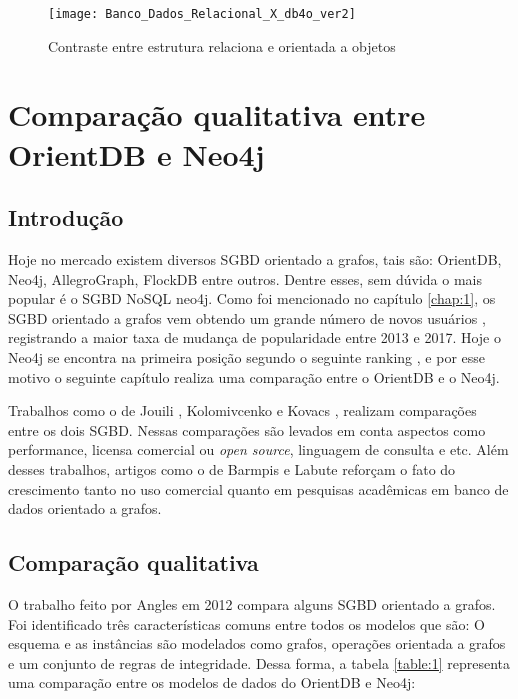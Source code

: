 \begin{figure}[h]
	\centering
    \texttt{[image: Banco\_Dados\_Relacional\_X\_db4o\_ver2]}
    \caption{Contraste entre estrutura relaciona e orientada a objetos}
    \label{fig:db4o}
\end{figure} 

\section{Comparação qualitativa entre OrientDB e Neo4j} \label{comparison_graph_nosql}

\subsection{Introdução}

	Hoje no mercado existem diversos SGBD orientado a grafos, tais são: OrientDB, Neo4j, AllegroGraph, FlockDB entre outros. Dentre esses, sem dúvida o mais popular é o SGBD NoSQL neo4j. Como foi mencionado no capítulo \ref{chap:1}, os SGBD orientado a grafos vem obtendo um grande número de novos usuários \cite{Dbmspopularity}, registrando a maior taxa de mudança de popularidade entre 2013 e 2017. Hoje o Neo4j se encontra na primeira posição segundo o seguinte ranking \cite{neo4jprimeiro}, e por esse motivo o seguinte capítulo realiza uma comparação entre o OrientDB e o Neo4j.
	
	Trabalhos como o de Jouili \cite{jouili2013empirical}, Kolomivcenko \cite{kolomivcenko2013experimental} e Kovacs \cite{kovacs2016cassandra}, realizam comparações entre os dois SGBD. Nessas comparações são levados em conta aspectos como performance, licensa comercial ou \textit{open source}, linguagem de consulta e etc. Além desses trabalhos, artigos como o de Barmpis \cite{barmpis2014evaluation} e Labute \cite{labute2014review} reforçam o fato do crescimento tanto no uso comercial quanto em pesquisas acadêmicas em banco de dados orientado a grafos.
	
\subsection{Comparação qualitativa}

	O trabalho feito por Angles \cite{angles2012comparison} em 2012 compara alguns SGBD orientado a grafos. Foi identificado três características comuns entre todos os modelos que são: O esquema e as instâncias são modelados como grafos, operações orientada a grafos e um conjunto de regras de integridade. Dessa forma, a tabela \ref{table:1} representa uma comparação entre os modelos de dados do OrientDB e Neo4j:
	
